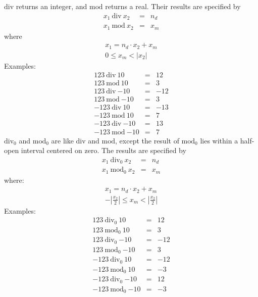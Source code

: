 $\mathrm{div}$ returns an integer, and $\mathrm{mod}$ returns a real.
Their results are specified by
%
\begin{eqnarray*}
x_1~\mathrm{div}~x_2 &=& n_d\\
x_1~\mathrm{mod}~x_2 &=& x_m
\end{eqnarray*}
%
where
%
\begin{displaymath}
\begin{array}{c}
x_1 = n_d \cdot x_2 + x_m\\
0 \leq x_m < |x_2|
\end{array}
\end{displaymath}
%
Examples:
\begin{eqnarray*}
123~\mathrm{div}~10    &=&  12\\
123~\mathrm{mod}~10    &=&  3\\
123~\mathrm{div}~\textrm{$-10$}   &=&  -12\\
123~\mathrm{mod}~\textrm{$-10$}   &=&  3\\
-123~\mathrm{div}~10    &=&  -13\\
-123~\mathrm{mod}~10    &=&  7\\
-123~\mathrm{div}~\textrm{$-10$}   &=&  13\\
-123~\mathrm{mod}~\textrm{$-10$}   &=&  7
\end{eqnarray*}
%
$\mathrm{div}_0$ and $\mathrm{mod}_0$ are like $\mathrm{div}$ and
$\mathrm{mod}$, except the result of $\mathrm{mod}_0$ lies within a
half-open interval centered on zero.  The results are specified by
%
\begin{eqnarray*}
x_1~\mathrm{div}_0~x_2 &=& n_d\\
x_1~\mathrm{mod}_0~x_2 &=& x_m
\end{eqnarray*}
%
where:
%
\begin{displaymath}
\begin{array}{c}
x_1 = n_d \cdot x_2 + x_m\\
-|\frac{x_2}{2}| \leq x_m < |\frac{x_2}{2}|
\end{array}
\end{displaymath}
%
Examples:
%
\begin{eqnarray*}
123~\mathrm{div}_0~10    &=&  12\\
123~\mathrm{mod}_0~10    &=&  3\\
123~\mathrm{div}_0~\textrm{$-10$}   &=&  -12\\
123~\mathrm{mod}_0~\textrm{$-10$}   &=&  3\\
-123~\mathrm{div}_0~10    &=&  -12\\
-123~\mathrm{mod}_0~10    &=&  -3\\
-123~\mathrm{div}_0~\textrm{$-10$}   &=&  12\\
-123~\mathrm{mod}_0~\textrm{$-10$}   &=&  -3
\end{eqnarray*}

